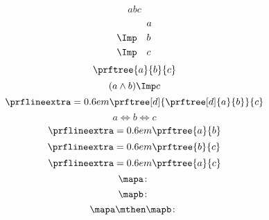 {\begin{forslides}
\begin{equation}
{                {a}
                {b}}
            {c}
        \end{equation}
        \begin{equation}
            \label{eq:abc_2}
            \begin{aligned}
                           & a \\
                \Imp \quad & b \\
                \Imp \quad & c
            \end{aligned}
        \end{equation}
        \begin{equation}
            \label{eq:abc_3}
            \prftree{a}{b}{c}
        \end{equation}
        \begin{equation}
            \label{eq:abc_4}
            (a\wedge b)\Imp c
        \end{equation}
        \begin{equation}
            \label{eq:abc_5}
            \prflineextra=0.6em
            \prftree[d]
            {\prftree[d]
                {a}
                {b}}
            {c}
        \end{equation}
        \begin{equation}
            \label{eq:abc_6}
            a\Leftrightarrow b \Leftrightarrow c
        \end{equation}
        \begin{equation}
            \label{eq:abc_7}
            \prflineextra=0.6em
            \prftree{a}{b}
        \end{equation}
        \begin{equation}
            \label{eq:abc_8}
            \prflineextra=0.6em
            \prftree{b}{c}
        \end{equation}
        \begin{equation}
            \label{eq:abc_9}
            \prflineextra=0.6em
            \prftree{a}{c}
        \end{equation}
        \begin{equation}
            \label{eq:mapf}
            \mapa \colon
        \end{equation}
        \begin{equation}
            \label{eq:mapg}
            \mapb \colon
        \end{equation}
        \begin{equation}
            \label{eq:mapcomp}
            \mapa \mthen \mapb \colon

\end{equation}
\end{forslides}}
